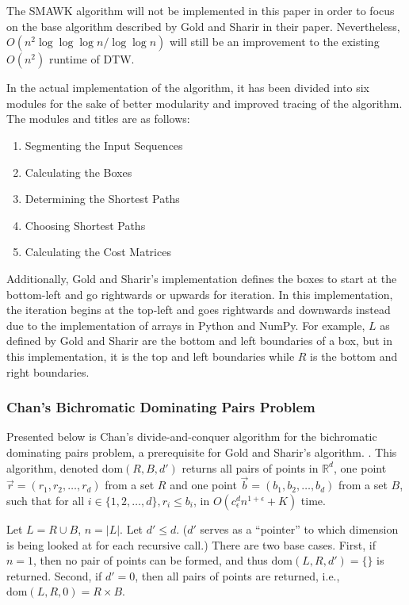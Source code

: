 The SMAWK algorithm will not be implemented in this paper in order to focus on the base algorithm described by Gold and Sharir in their paper. Nevertheless, $O(n^2 \log\log\log n / \log \log n)$ will still be an improvement to the existing $O(n^2)$ runtime of DTW.

In the actual implementation of the algorithm, it has been divided into six modules for the sake of better modularity and improved tracing of the algorithm. The modules and titles are as follows:
\begin{enumerate}
    \item Segmenting the Input Sequences
    \item Calculating the Boxes
    \item Determining the Shortest Paths
    \item Choosing Shortest Paths
    \item Calculating the Cost Matrices
\end{enumerate}
Additionally, Gold and Sharir's implementation defines the boxes to start at the bottom-left and go rightwards or upwards for iteration. In this implementation, the iteration begins at the top-left and goes rightwards and downwards instead due to the implementation of arrays in Python and NumPy. For example, $L$ as defined by Gold and Sharir are the bottom and left boundaries of a box, but in this implementation, it is the top and left boundaries while $R$ is the bottom and right boundaries.

\subsubsection{Chan's Bichromatic Dominating Pairs Problem}
Presented below is Chan's divide-and-conquer algorithm for the bichromatic dominating pairs problem, a prerequisite for Gold and Sharir's algorithm. \cite{ChanDominance}. This algorithm, denoted $\text{dom}(R,B,d')$ returns all pairs of points in $\mathbb{R}^d$, one point $\vec{r}=(r_1,r_2,\dotsc,r_d)$ from a set $R$ and one point $\vec{b}=(b_1,b_2,\dotsc,b_d)$ from a set $B$, such that for all $i\in\{1,2,\dotsc,d\}, r_i\le b_i$, in $O(c_\epsilon^dn^{1+\epsilon}+K)$ time.

Let $L=R\cup B$, $n=|L|$. Let $d'\le d$. ($d'$ serves as a ``pointer'' to which dimension is being looked at for each recursive call.) There are two base cases.
First, if $n=1$, then no pair of points can be formed, and thus $\text{dom}(L,R,d')=\{\}$ is returned. Second, if $d'=0$, then all pairs of points are returned, i.e., $\text{dom}(L,R,0)=R\times B$.

